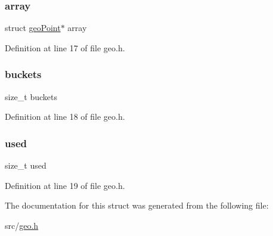 \subsubsection{\texorpdfstring{array}{array}}
{\footnotesize\ttfamily struct \hyperlink{structgeo_point}{geo\+Point}$\ast$ array}



Definition at line 17 of file geo.\+h.

\mbox{\label{structgeo_array_af69e9b05b4318b72a5be55082b78fb58}} 
\subsubsection{\texorpdfstring{buckets}{buckets}}
{\footnotesize\ttfamily size\+\_\+t buckets}



Definition at line 18 of file geo.\+h.

\mbox{\label{structgeo_array_ae8cc011bf3ee2d3c19743095ffc0f7a5}} 
\subsubsection{\texorpdfstring{used}{used}}
{\footnotesize\ttfamily size\+\_\+t used}



Definition at line 19 of file geo.\+h.



The documentation for this struct was generated from the following file\+:\begin{DoxyCompactItemize}
\item 
src/\hyperlink{geo_8h}{geo.\+h}\end{DoxyCompactItemize}
